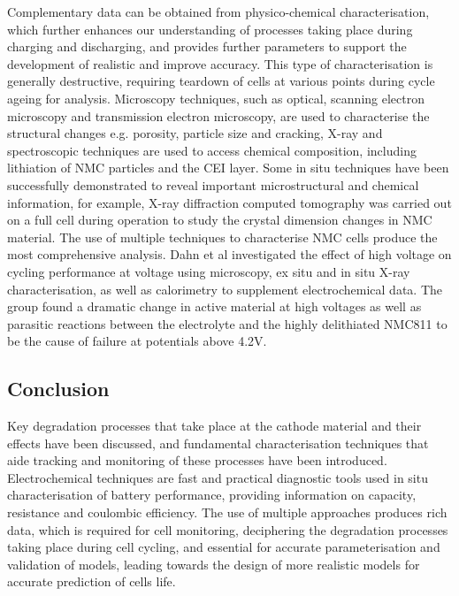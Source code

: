 \documentclass[aps,prb,twocolumn,superscriptaddress,reprint]{revtex4-1}
\begin{document}
Complementary data can be obtained from physico-chemical characterisation, which further enhances our understanding of processes taking place during charging and discharging, and  provides further parameters to support the development of realistic and improve accuracy. This type of characterisation is generally destructive, requiring teardown of cells at various points during cycle ageing for analysis. Microscopy techniques, such as optical, scanning electron microscopy and transmission electron microscopy, are used to characterise the structural changes e.g.  porosity, particle size and cracking, X-ray and spectroscopic techniques are used to access chemical composition, including lithiation of NMC particles and the CEI layer.\cite{Waldmann2016} Some in situ techniques have been successfully demonstrated to reveal important microstructural and chemical information, for example, X-ray diffraction computed tomography was carried out on a full cell during operation to study the crystal dimension changes in NMC material.\cite{Sohrab2020} The use of multiple techniques to characterise NMC cells  produce the most comprehensive analysis. Dahn et al investigated the effect of high voltage on cycling performance at voltage using microscopy, ex situ and in situ X-ray characterisation, as well as calorimetry to supplement electrochemical data. The group found a dramatic change in active material at high voltages as well as parasitic reactions between the electrolyte and the highly delithiated NMC811 to be the cause of failure at potentials above 4.2V.\cite{Li2015} 

\subsection{Conclusion}
Key degradation processes that take place at the cathode material and their effects have been discussed, and fundamental characterisation techniques that aide tracking and monitoring of these processes have been introduced. Electrochemical techniques are fast and practical diagnostic tools used in situ characterisation of battery performance, providing information on capacity, resistance and coulombic efficiency. The use of multiple approaches produces rich data, which is required for cell monitoring, deciphering the degradation processes taking place during cell cycling, and essential for accurate parameterisation and validation of models, leading towards the design of more realistic models for accurate prediction of cells life.
\end{document}
